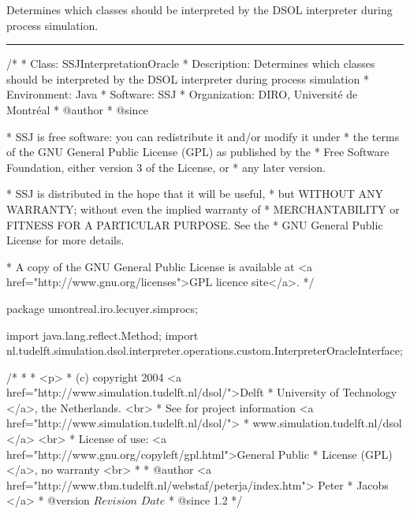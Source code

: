 
Determines which classes should be interpreted by the DSOL
interpreter during process simulation.

\bigskip\hrule

\begin{code}
\begin{hide}
/*
 * Class:        SSJInterpretationOracle
 * Description:  Determines which classes should be interpreted by the DSOL
                 interpreter during process simulation
 * Environment:  Java
 * Software:     SSJ 
 * Organization: DIRO, Université de Montréal
 * @author       
 * @since

 * SSJ is free software: you can redistribute it and/or modify it under
 * the terms of the GNU General Public License (GPL) as published by the
 * Free Software Foundation, either version 3 of the License, or
 * any later version.

 * SSJ is distributed in the hope that it will be useful,
 * but WITHOUT ANY WARRANTY; without even the implied warranty of
 * MERCHANTABILITY or FITNESS FOR A PARTICULAR PURPOSE.  See the
 * GNU General Public License for more details.

 * A copy of the GNU General Public License is available at
   <a href="http://www.gnu.org/licenses">GPL licence site</a>.
 */
\end{hide}
package umontreal.iro.lecuyer.simprocs;\begin{hide}

import java.lang.reflect.Method;
import nl.tudelft.simulation.dsol.interpreter.operations.custom.InterpreterOracleInterface;

/*
 *
 * <p>
 * (c) copyright 2004 <a href="http://www.simulation.tudelft.nl/dsol/">Delft
 * University of Technology </a>, the Netherlands. <br>
 * See for project information <a href="http://www.simulation.tudelft.nl/dsol/">
 * www.simulation.tudelft.nl/dsol </a> <br>
 * License of use: <a href="http://www.gnu.org/copyleft/gpl.html">General Public
 * License (GPL) </a>, no warranty <br>
 *
 * @author <a href="http://www.tbm.tudelft.nl/webstaf/peterja/index.htm"> Peter
 *         Jacobs </a>
 * @version $Revision$ $Date$
 * @since 1.2
 */ \end{hide}



\end{code}
